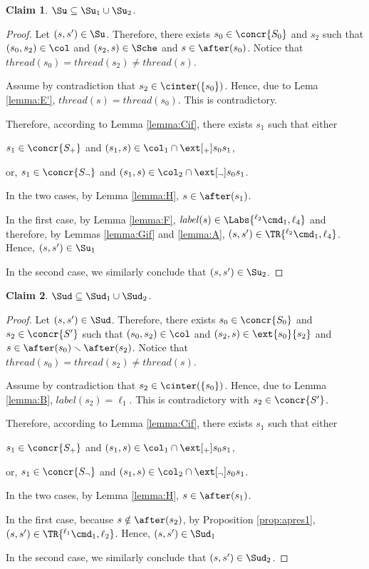 \documentclass[12pt]{article}
\let\firstunion\cup
\let\firstinter\cap
\let\cup\firstunion
\let\cap\firstinter
\renewcommand{\subset}{\subseteq}
\newcommand{\li}[1]{ {}^{\ell_{#1}}  }
\newcommand{\lbl}{\mathit{label}}
\newcommand{\thread}{\mathit{thread}}
\newtheorem{claim}{Claim}
\begin{document}
\begin{claim}\label{claim:ifSu}\(\Su\subset\Su_1\cup\Su_2\).
\end{claim}
\begin{proof}
 Let \((s,s')\in\Su\).
 Therefore, there exists \(s_0\in\concr{S_0}\) and \(s_2\) such that \((s_0,s_2)\in\col\) and \((s_2,s)\in\Sche\) and \(s\in\after(s_0)\). Notice that \(\thread(s_0)=\thread(s_2)\neq\thread(s)\).
 
 Assume by contradiction that \(s_2\in\cinter(\{s_0\})\). Hence, due to Lema \ref{lemma:E'}, \(\thread(s)=\thread(s_0)\). This is contradictory.
 
 Therefore, according to Lemma \ref{lemma:Cif}, there exists \(s_1\) such that either \begin{inparaenum}[(1)]\item
 \(s_1\in\concr{S_{{+}}}\) and \((s_1,s)\in\col_{1}\cap\ext[_{{+}}]{s_0}{s_1}\),
 \item or, \(s_1\in\concr{S_{{\neg}}}\) and \((s_1,s)\in\col_{2}\cap\ext[_{{\neg}}]{s_0}{s_1}\).\end{inparaenum}
  In the two cases, by Lemma \ref{lemma:H}, \(s\in\after(s_1)\).
 
 In the first case, by Lemma \ref{lemma:F}, \(\lbl(s)\in\Labs{\li2\cmd_1,\ell_4}\) and therefore, by Lemmas \ref{lemma:Gif} and \ref{lemma:A}, \((s,s')\in\TR{\li2\cmd_1,\ell_4}\).
 Hence, \((s,s')\in\Su_1\)
 
 In the second case, we similarly conclude that  \((s,s')\in\Su_2\).
 \end{proof}
 
\begin{claim}\label{claim:ifSud}\(\Sud\subset\Sud_1\cup\Sud_2\).
\end{claim}
\begin{proof}
 Let \((s,s')\in\Sud\).
 Therefore, there exists \(s_0\in\concr{S_0}\) and \(s_2\in\concr{S'}\) such that \((s_0,s_2)\in\col\) and \((s_2,s)\in\ext{s_0}{s_2}\) and \(s\in\after(s_0)\smallsetminus\after(s_2)\). Notice that \(\thread(s_0)=\thread(s_2)\neq\thread(s)\).
 
 Assume by contradiction that \(s_2\in\cinter(\{s_0\})\). Hence, due to Lemma \ref{lemma:B}, \(\lbl(s_2)=\ell_1\). This is contradictory with \(s_2\in\concr{S'}\).
 
 Therefore, according to Lemma \ref{lemma:Cif}, there exists \(s_1\) such that either \begin{inparaenum}[(1)]\item
 \(s_1\in\concr{S_{{+}}}\) and \((s_1,s)\in\col_{1}\cap\ext[_{{+}}]{s_0}{s_1}\),
 \item or, \(s_1\in\concr{S_{{\neg}}}\) and \((s_1,s)\in\col_{2}\cap\ext[_{{\neg}}]{s_0}{s_1}\).\end{inparaenum}
  In the two cases, by Lemma \ref{lemma:H}, \(s\in\after(s_1)\).
 
 In the first case, because \(s\notin\after(s_2)\), by Proposition \ref{prop:apres1}, \((s,s')\in\TR{\li1\cmd_1,\ell_2}\). Hence, \((s,s')\in\Sud_1\)
 

 In the second case, we similarly conclude that  \((s,s')\in\Sud_2\).
 \end{proof}
 
\end{document}
